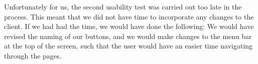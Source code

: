 Unfortunately for us, the second usability test was carried out too late in the process. This meant that we did not have time to incorporate any changes to the client. If we had had the time, we would have done the following: We would have revised the naming of our buttons, and we would make changes to the menu bar at the top of the screen, such that the user would have an easier time navigating through the pages.
